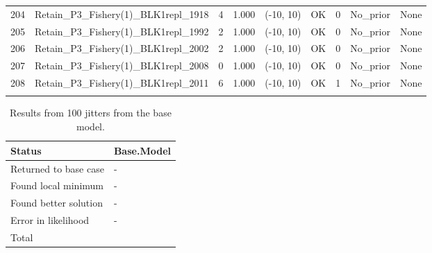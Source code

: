 \documentclass[12pt,]{article}
\begin{document}
\begin{landscape}
\begin{longtable}{rlrrcccll}
  204 & Retain\_P3\_Fishery(1)\_BLK1repl\_1918 & 4 & 1.000 & (-10, 10) & OK & 0 & No\_prior & None \\ 
  205 & Retain\_P3\_Fishery(1)\_BLK1repl\_1992 & 2 & 1.000 & (-10, 10) & OK & 0 & No\_prior & None \\ 
  206 & Retain\_P3\_Fishery(1)\_BLK1repl\_2002 & 2 & 1.000 & (-10, 10) & OK & 0 & No\_prior & None \\ 
  207 & Retain\_P3\_Fishery(1)\_BLK1repl\_2008 & 0 & 1.000 & (-10, 10) & OK & 0 & No\_prior & None \\ 
  208 & Retain\_P3\_Fishery(1)\_BLK1repl\_2011 & 6 & 1.000 & (-10, 10) & OK & 1 & No\_prior & None \\ 
   \hline
\hline
\label{tab:model_params}
\end{longtable}
\end{landscape}

\newpage

\begin{table}[ht]
\centering
\caption{Results from 100 jitters from the base model.} 
\label{tab:jitter}
\begin{tabular}{>{\centering}p{2in}>{\centering}p{1in}}
  \hline
Status & Base.Model \\ 
  \hline
Returned to base case & - \\ 
  Found local minimum & - \\ 
  Found better solution & - \\ 
  Error in likelihood & - \\ 
  Total & 100 \\ 
   \hline
\end{tabular}
\end{table}

\FloatBarrier

\newpage
\end{document}
